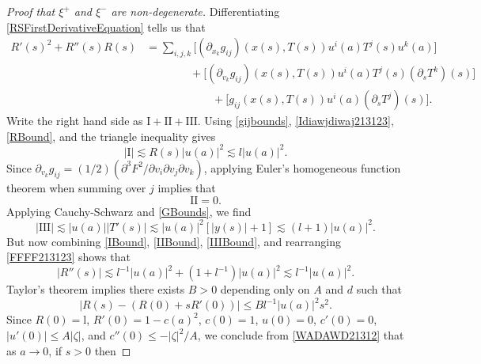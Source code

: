 \begin{proof}[Proof that $\xi^+$ and $\xi^-$ are non-degenerate]
    Differentiating \eqref{RSFirstDerivativeEquation} tells us that
    \begin{equation} \label{FFFF213123}
    \begin{split}
        R'(s)^2 + R''(s) R(s) &= \sum\nolimits_{i,j,k} \Bigg[ (\partial_{x_k} g_{ij})( x(s), T(s) ) u^i(a) T^j(s) u^k(a) \Bigg]\\
        &\quad\quad\quad\quad + \Bigg[ (\partial_{v_k} g_{ij} )(x(s), T(s)) u^i(a) T^j(s) (\partial_s T^k)(s)   \Bigg]\\
        &\quad\quad\quad\quad\quad\quad + \Bigg[ g_{ij}( x(s), T(s) ) u^i(a) (\partial_s T^j)(s) \Bigg].
    \end{split}
    \end{equation}
    Write the right hand side as $\text{I} + \text{II} + \text{III}$. Using \eqref{gijbounds}, \eqref{Idiawjdiwaj213123}, \eqref{RBound}, and the triangle inequality gives
    \begin{equation} \label{IBound}
        |\text{I}| \lesssim R(s) |u(a)|^2 \lesssim l |u(a)|^2.
    \end{equation}
    Since $\partial_{v_k} g_{ij} = (1/2) (\partial^3F^2 / \partial v_i \partial v_j \partial v_k)$, applying Euler's homogeneous function theorem when summing over $j$ implies that
    \begin{equation} \label{IIBound}
        \text{II} = 0.
    \end{equation}
    Applying Cauchy-Schwarz and \eqref{GBounds}, we find
    \begin{equation} \label{IIIBound}
        |\text{III}| \lesssim |u(a)| |T'(s)| \lesssim |u(a)|^2 [|y(s)| + 1] \lesssim (l + 1) |u(a)|^2.
    \end{equation}
    But now combining \eqref{IBound}, \eqref{IIBound}, \eqref{IIIBound}, and rearranging \eqref{FFFF213123} shows that
    \begin{equation}
        |R''(s)| \lesssim l^{-1} |u(a)|^2 + (1 + l^{-1}) |u(a)|^2 \lesssim l^{-1} |u(a)|^2.
    \end{equation}
    Taylor's theorem implies there exists $B > 0$ depending only on $A$ and $d$ such that
    \begin{equation} \label{WADAWD21312}
        |R(s) - (R(0) + s R'(0))| \leq B l^{-1} |u(a)|^2 s^2.
    \end{equation}
    Since $R(0) = $l, $R'(0) = 1 - c(a)^2$, $c(0) = 1$, $u(0) = 0$, $c'(0) = 0$, $|u'(0)| \leq A |\zeta|$, and $c''(0) \leq - |\zeta|^2 / A$, we conclude from \eqref{WADAWD21312} that as $a \to 0$, if $s > 0$ then

\end{proof}
